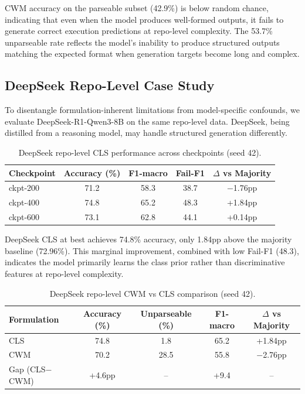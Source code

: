\documentclass[11pt]{article}
\begin{document}
CWM accuracy on the parseable subset (42.9\%) is below random chance, indicating that even when the model produces well-formed outputs, it fails to generate correct execution predictions at repo-level complexity. The 53.7\% unparseable rate reflects the model's inability to produce structured outputs matching the expected format when generation targets become long and complex.

\subsection{DeepSeek Repo-Level Case Study}
\label{sec:deepseek-repo}

To disentangle formulation-inherent limitations from model-specific confounds, we evaluate DeepSeek-R1-Qwen3-8B on the same repo-level data. DeepSeek, being distilled from a reasoning model, may handle structured generation differently.

\begin{table}[h]
\centering
\caption{DeepSeek repo-level CLS performance across checkpoints (seed 42).}
\label{tab:deepseek-cls}
\begin{tabular}{lcccc}
\toprule
Checkpoint & Accuracy (\%) & F1-macro & Fail-F1 & $\Delta$ vs Majority \\
\midrule
ckpt-200 & 71.2 & 58.3 & 38.7 & $-$1.76pp \\
ckpt-400 & 74.8 & 65.2 & 48.3 & +1.84pp \\
ckpt-600 & 73.1 & 62.8 & 44.1 & +0.14pp \\
\bottomrule
\end{tabular}
\end{table}

DeepSeek CLS at best achieves 74.8\% accuracy, only 1.84pp above the majority baseline (72.96\%). This marginal improvement, combined with low Fail-F1 (48.3), indicates the model primarily learns the class prior rather than discriminative features at repo-level complexity.

\begin{table}[h]
\centering
\caption{DeepSeek repo-level CWM vs CLS comparison (seed 42).}
\label{tab:deepseek-cwm-cls}
\begin{tabular}{lcccc}
\toprule
Formulation & Accuracy (\%) & Unparseable (\%) & F1-macro & $\Delta$ vs Majority \\
\midrule
CLS & 74.8 & 1.8 & 65.2 & +1.84pp \\
CWM & 70.2 & 28.5 & 55.8 & $-$2.76pp \\
\midrule
Gap (CLS$-$CWM) & +4.6pp & -- & +9.4 & -- \\
\bottomrule
\end{tabular}
\end{table}
\end{document}
